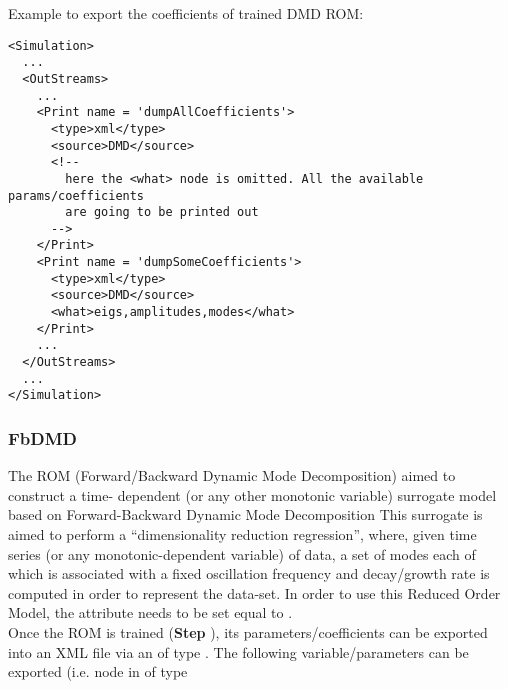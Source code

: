 Example to export the coefficients of trained DMD ROM:
\begin{lstlisting}[style=XML,morekeywords={name,subType}]
<Simulation>
  ...
  <OutStreams>
    ...
    <Print name = 'dumpAllCoefficients'>
      <type>xml</type>
      <source>DMD</source>
      <!--
        here the <what> node is omitted. All the available params/coefficients
        are going to be printed out
      -->
    </Print>
    <Print name = 'dumpSomeCoefficients'>
      <type>xml</type>
      <source>DMD</source>
      <what>eigs,amplitudes,modes</what>
    </Print>
    ...
  </OutStreams>
  ...
</Simulation>
\end{lstlisting}


\subsubsection{FbDMD}
  The  ROM (Forward/Backward Dynamic Mode Decomposition) aimed to construct a time-
  dependent (or any other monotonic     variable) surrogate model based on Forward-Backward Dynamic
  Mode Decomposition     This surrogate is aimed to perform a ``dimensionality reduction
  regression'', where, given time     series (or any monotonic-dependent variable) of data, a set of
  modes each of which is associated     with a fixed oscillation frequency and decay/growth rate is
  computed     in order to represent the data-set.     In order to use this Reduced Order Model, the
   attribute      needs to be set equal to .     \\
  Once the ROM  is trained (\textbf{Step} ), its parameters/coefficients can be
  exported into an XML file     via an  of type . The following
  variable/parameters  can be exported (i.e.  node     in  of type

